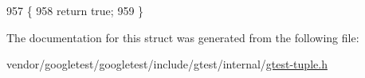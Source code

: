 \begin{DoxyCode}
957                                                    \{
958     \textcolor{keywordflow}{return} \textcolor{keyword}{true};
959   \}
\end{DoxyCode}


The documentation for this struct was generated from the following file\+:\begin{DoxyCompactItemize}
\item 
vendor/googletest/googletest/include/gtest/internal/\hyperlink{gtest-tuple_8h}{gtest-\/tuple.\+h}\end{DoxyCompactItemize}
